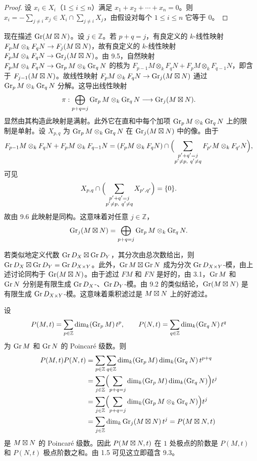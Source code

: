 \begin{proof}
设 $x_i\in X_i$（$1\le i\le n$）满足 $x_1+x_2+\cdots+x_n=0$。则 $x_i=-\sum_{j\neq i}x_j\in X_i\cap\sum_{j\neq i}X_j$，由假设对每个 $1\le i\le n$ 它等于 $0$。
\end{proof}

现在描述 $\operatorname{Gr}(M\mathbin{\boxtimes} N)$。设 $j\in\mathbb{Z}$。若 $p+q=j$，有良定义的 $k$-线性映射 $F_pM\otimes_k F_qN\to F_j(M\mathbin{\boxtimes} N)$，故有良定义的 $k$-线性映射 $F_pM\otimes_k F_qN\to\operatorname{Gr}_j(M\mathbin{\boxtimes} N)$。由 9.5，自然映射 $F_pM\otimes_k F_qN\to\operatorname{Gr}_pM\otimes_k\operatorname{Gr}_qN$ 的核为 $F_{p-1}M\otimes_k F_qN+F_pM\otimes_k F_{q-1}N$，即含于 $F_{j-1}(M\mathbin{\boxtimes} N)$。故线性映射 $F_pM\otimes_k F_qN\to\operatorname{Gr}_j(M\mathbin{\boxtimes} N)$ 通过 $\operatorname{Gr}_pM\otimes_k\operatorname{Gr}_qN$ 分解。这导出线性映射
$$\pi:\bigoplus_{p+q=j}\operatorname{Gr}_pM\otimes_k\operatorname{Gr}_qN\longrightarrow\operatorname{Gr}_j(M\mathbin{\boxtimes} N).$$
显然由其构造此映射是满射。此外它在直和中每个加项 $\operatorname{Gr}_pM\otimes_k\operatorname{Gr}_qN$ 上的限制是单射。设 $X_{p,q}$ 为 $\operatorname{Gr}_pM\otimes_k\operatorname{Gr}_qN$ 在 $\operatorname{Gr}_j(M\mathbin{\boxtimes} N)$ 中的像。由于
$$F_{p-1}M\otimes_k F_qN+F_pM\otimes_k F_{q-1}N=(F_pM\otimes_k F_qN)\cap\Bigl(\sum_{\substack{p'+q'=j\\ p'\neq p,\ q'\neq q}}F_{p'}M\otimes_k F_{q'}N\Bigr),$$
可见
$$X_{p,q}\cap\Bigl(\sum_{\substack{p'+q'=j\\ p'\neq p,\ q'\neq q}}X_{p',q'}\Bigr)=\{0\}.$$
故由 9.6 此映射是同构。这意味着对任意 $j\in\mathbb{Z}$，
$$\operatorname{Gr}_j(M\mathbin{\boxtimes} N)=\bigoplus_{p+q=j}\operatorname{Gr}_pM\otimes_k\operatorname{Gr}_qN.$$

若类似地定义代数 $\operatorname{Gr} D_X\mathbin{\boxtimes}\operatorname{Gr} D_Y$，其分次由总次数给出，则 $\operatorname{Gr} D_X\mathbin{\boxtimes}\operatorname{Gr} D_Y=\operatorname{Gr} D_{X\times Y}$。此外，$\operatorname{Gr} M\mathbin{\boxtimes}\operatorname{Gr} N$ 成为分次 $\operatorname{Gr} D_{X\times Y}$-模，由上述讨论同构于 $\operatorname{Gr}(M\mathbin{\boxtimes} N)$。由于滤过 $F M$ 和 $F N$ 是好的，由 3.1，$\operatorname{Gr} M$ 和 $\operatorname{Gr} N$ 分别是有限生成 $\operatorname{Gr} D_X$-、$\operatorname{Gr} D_Y$-模。由 9.2 的类似结论，$\operatorname{Gr}(M\mathbin{\boxtimes} N)$ 是有限生成 $\operatorname{Gr} D_{X\times Y}$-模。这意味着乘积滤过是 $M\mathbin{\boxtimes} N$ 上的好滤过。

设
$$P(M,t)=\sum_{p\in\mathbb{Z}}\dim_k(\operatorname{Gr}_p M)\,t^p,\qquad P(N,t)=\sum_{q\in\mathbb{Z}}\dim_k(\operatorname{Gr}_q N)\,t^q$$
为 $\operatorname{Gr} M$ 和 $\operatorname{Gr} N$ 的 Poincaré 级数。则
\begin{align*}
P(M,t)P(N,t)&=\sum_{p\in\mathbb{Z}}\sum_{q\in\mathbb{Z}}\dim_k(\operatorname{Gr}_p M)\dim_k(\operatorname{Gr}_q N)\,t^{p+q}\\
&=\sum_{j\in\mathbb{Z}}\Bigl(\sum_{p+q=j}\dim_k(\operatorname{Gr}_p M)\dim_k(\operatorname{Gr}_q N)\Bigr)t^j\\
&=\sum_{j\in\mathbb{Z}}\Bigl(\sum_{p+q=j}\dim_k(\operatorname{Gr}_p M\otimes_k\operatorname{Gr}_q N)\Bigr)t^j\\
&=\sum_{j\in\mathbb{Z}}\dim_k\operatorname{Gr}_j(M\mathbin{\boxtimes} N)\,t^j=P(M\mathbin{\boxtimes} N,t)
\end{align*}
是 $M\mathbin{\boxtimes} N$ 的 Poincaré 级数。因此 $P(M\mathbin{\boxtimes} N,t)$ 在 $1$ 处极点的阶数是 $P(M,t)$ 和 $P(N,t)$ 极点阶数之和。由 1.5 可见这立即蕴含 9.3。


